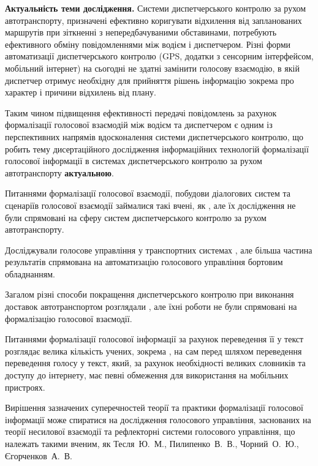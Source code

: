 \textbf{Актуальність теми дослідження.} 
Системи диспетчерського контролю за рухом автотранспорту, призначені ефективно коригувати відхилення від запланованих маршрутів при зіткненні з непередбачуваними обставинами, потребують ефективного обміну повідомленнями між водієм і диспетчером. Різні форми автоматизації диспетчерського контролю (GPS, додатки з сенсорним інтерфейсом, мобільний інтернет) на сьогодні не здатні замінити голосову взаємодію, в якій диспетчер отримує необхідну для прийняття рішень інформацію зокрема про характер і причини відхилень від плану. 

Таким чином підвищення ефективності передачі повідомлень за рахунок формалізації голосової взаємодій між водієм та диспетчером є одним із перспективних напрямів вдосконалення системи диспетчерського контролю, що робить тему дисертаційного дослідження інформаційних технологій формалізації голосової інформації в системах диспетчерського контролю за рухом автотранспорту \textbf{актуальною}.

\begin{refsection}
Питаннями формалізації голосової взаємодії, побудови діалогових систем та сценаріїв голосової взаємодії займалися такі вчені, як , але їх дослідження не були спрямовані на сферу систем диспетчерського контролю за рухом автотранспорту. 

Досліджували голосове управління у транспортних системах , але більша частина результатів спрямована на автоматизацію голосового управління бортовим обладнанням.

Загалом різні способи покращення диспетчерського контролю при виконання доставок автотранспортом розглядали , але їхні роботи не були спрямовані на формалізацію голосової взаємодії.

Питаннями формалізації голосової інформації за рахунок переведення її у текст розглядає велика кількість учених, зокрема , на сам перед шляхом переведення переведення голосу у текст, який, за рахунок необхідності великих словників та доступу до інтернету, має певні обмеження для використання на мобільних пристроях.

Вирішення зазначених суперечностей теорії та практики формалізації голосової інформації може спиратися на дослідження голосового управління, заснованих на теорії несилової взаємодії та рефлекторні системи голосового управління, що належать такими вченим, як Тесля~Ю.~М., Пилипенко~В.~В., Чорний~О.~Ю., Єгорченков~А.~В.
\end{refsection}

